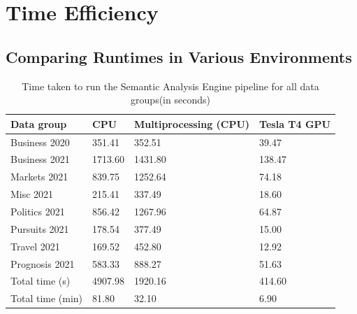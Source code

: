 \section{Time Efficiency}

\subsection{Comparing Runtimes in Various Environments}
\vspace{-1ex}

\begin{table}[H] 
\centering
\renewcommand{\arraystretch}{1.05}
\begin{tabularx}{\textwidth}{X X X X} 
 \hline
Data group & CPU &  Multiprocessing (CPU) & Tesla T4 GPU \\
 \hline
 Business 2020  & 351.41  & 352.51  & 39.47 \\ 
 Business 2021  & 1713.60 & 1431.80 & 138.47 \\
 Markets 2021   & 839.75  & 1252.64 & 74.18\\
 Misc 2021      & 215.41  & 337.49  & 18.60 \\
 Politics 2021  & 856.42  & 1267.96 & 64.87 \\
 Pursuits 2021  & 178.54  & 377.49  & 15.00 \\ 
 Travel 2021    & 169.52  & 452.80  & 12.92 \\
 Prognosis 2021 & 583.33  & 888.27  & 51.63 \\ 
 \hline
 Total time (s) & 4907.98 & 1920.16 & 414.60 \\ 
 Total time (min) & 81.80  & 32.10 & 6.90\\ 
\end{tabularx}

\caption{Time taken to run the Semantic Analysis Engine pipeline for all data groups(in seconds)}
\label{table:cputime}
\end{table}
\vspace{-1em}
